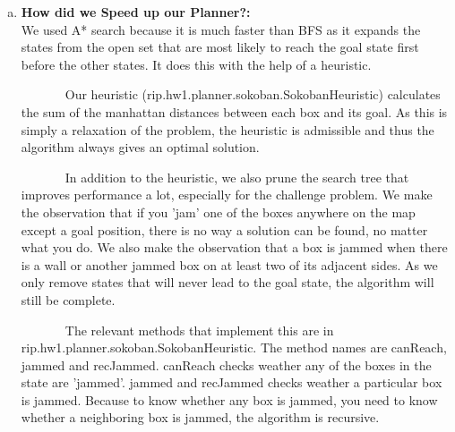 \documentclass[]{article}
\begin{document}
\begin{enumerate}[(a)]
		\item \textbf{How did we Speed up our Planner?:}\\
		We used A* search because it is much faster than BFS as it expands the states from the open set that are most likely to reach the goal state first before the other states. It does this with the help of a heuristic.
		
		~~~~~~~Our heuristic (rip.hw1.planner.sokoban.SokobanHeuristic) calculates the sum of the manhattan distances between each box and its goal. As this is simply a relaxation of the problem, the heuristic is admissible and thus the algorithm always gives an optimal solution.
		
		~~~~~~~In addition to the heuristic, we also prune the search tree that improves performance a lot, especially for the challenge problem. We make the observation that if you 'jam' one of the boxes anywhere on the map except a goal position, there is no way a solution can be found, no matter what you do. We also make the observation that a box is jammed when there is a wall or another jammed box on at least two of its adjacent sides. As we only remove states that will never lead to the goal state, the algorithm will still be complete. 
		
		~~~~~~~The relevant methods that implement this are in rip.hw1.planner.sokoban.SokobanHeuristic. The method names are canReach, jammed and recJammed. canReach checks weather any of the boxes in the state are 'jammed'. jammed and recJammed checks weather a particular box is jammed. Because to know whether any box is jammed, you need to know whether a neighboring box is jammed, the algorithm is recursive.
		
	\end{enumerate}
	
\end{document}
